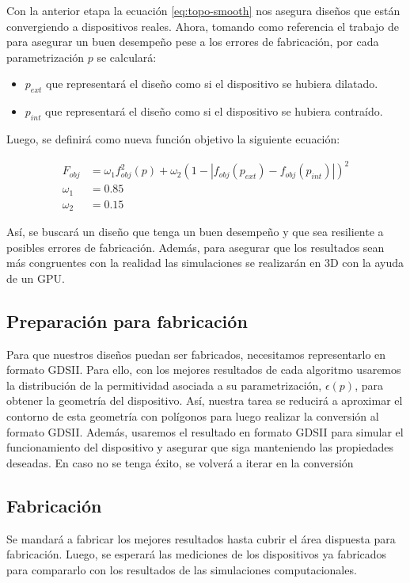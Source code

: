 Con la anterior etapa la ecuación \ref{eq:topo-smooth} nos asegura diseños que están convergiendo a dispositivos reales.
Ahora, tomando como referencia el trabajo de \cite{Hammond20} para asegurar un buen desempeño pese a los errores de fabricación, por cada parametrización $p$ se calculará:

\begin{itemize}
  \item $p_{ext}$ que representará el diseño como si el dispositivo se hubiera dilatado.
  \item $p_{int}$ que representará el diseño como si el dispositivo se hubiera contraído.
\end{itemize}

Luego, se definirá como nueva función objetivo la siguiente ecuación:

\begin{equation}
  \begin{split}
    F_{obj} &= \omega_1 f^2_{obj}(p) + \omega_2 (1 - |f_{obj}(p_{ext}) - f_{obj}(p_{int})|)^2\\
    \omega_1 &= 0.85\\
    \omega_2 &= 0.15
  \end{split}
  \label{eq:final-fom}
\end{equation}

Así, se buscará un diseño que tenga un buen desempeño y que sea resiliente a posibles errores de fabricación.
Además, para asegurar que los resultados sean más congruentes con la realidad las simulaciones se realizarán en 3D con la ayuda de un GPU.

\subsection{Preparación para fabricación}

Para que nuestros diseños puedan ser fabricados, necesitamos representarlo en formato GDSII.
Para ello, con los mejores resultados de cada algoritmo usaremos la distribución de la permitividad asociada a su parametrización, $\epsilon(p)$,
para obtener la geometría del dispositivo.
Así, nuestra tarea se reducirá a aproximar el contorno de esta geometría con polígonos para luego realizar la conversión al formato GDSII.
Además, usaremos el resultado en formato GDSII para simular el funcionamiento del dispositivo y asegurar que siga manteniendo las propiedades deseadas.
En caso no se tenga éxito, se volverá a iterar en la conversión

\subsection{Fabricación}

Se mandará a fabricar los mejores resultados hasta cubrir el área dispuesta para fabricación. 
Luego, se esperará las mediciones de los dispositivos ya fabricados para compararlo con los resultados de las simulaciones computacionales.
